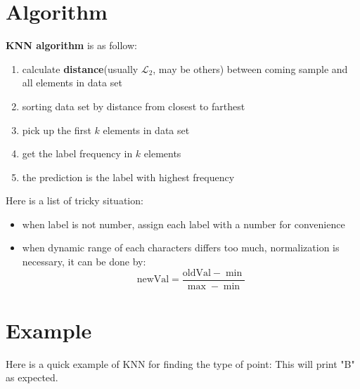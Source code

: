 \documentclass[10pt,a4paper,oneside]{article}
\begin{document}
\section{Algorithm}
\textbf{KNN algorithm} is as follow:
\begin{enumerate}
	\item calculate \textbf{distance}(usually $\mathcal{L}_2$, may be others) between coming sample and all elements in data set
	\item sorting data set by distance from closest to farthest
	\item pick up the first $k$ elements in data set
	\item get the label frequency in $k$ elements
	\item the prediction is the label with highest frequency
\end{enumerate}
Here is a list of tricky situation:
\begin{itemize}
	\item when label is not number, assign each label with a number for convenience
	\item when dynamic range of each characters differs too much, normalization is necessary, it can be done by:
	\[
	\text{newVal} = \frac{\text{oldVal} - \min}{\max - \min}
	\]  
\end{itemize}

\section{Example}
Here is a quick example of KNN for finding the type of point:
This will print "B" as expected.
\end{document}
